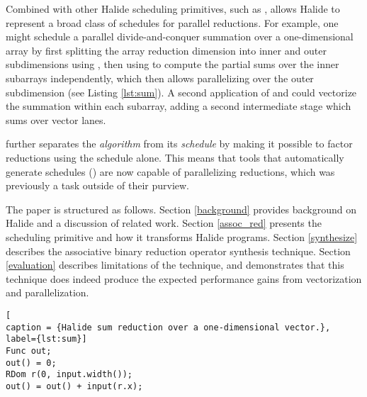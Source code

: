 Combined with other Halide scheduling primitives, such as ,  allows Halide to represent a broad class of schedules for parallel reductions. For example, one might schedule a parallel divide-and-conquer summation over a one-dimensional array by first splitting the array reduction dimension into inner and outer subdimensions using , then using  to compute the partial sums over the inner subarrays independently, which then allows parallelizing over the outer subdimension (see Listing \ref{lst:sum}). A second application of  and  could vectorize the summation within each subarray, adding a second intermediate stage which sums over vector lanes.

 further separates the \emph{algorithm} from its \emph{schedule} by making it possible to factor reductions using the schedule alone. This means that tools that automatically generate schedules (\cite{Mullapudi:2016:ASH:2897824.2925952}\cite{Ragan-Kelley:2013:HLC:2491956.2462176}) are now capable of parallelizing reductions, which was previously a task outside of their purview.


The paper is structured as follows. Section \ref{background} provides background on Halide and a discussion of related work. Section \ref{assoc_red} presents the  scheduling primitive and how it transforms Halide programs. Section \ref{synthesize} describes the associative binary reduction operator synthesis technique. Section \ref{evaluation} describes limitations of the technique, and demonstrates that this technique does indeed produce the expected performance gains from vectorization and parallelization.

\begin{lstlisting}[
caption = {Halide sum reduction over a one-dimensional vector.}, label={lst:sum}]
Func out;
out() = 0;
RDom r(0, input.width());
out() = out() + input(r.x);
\end{lstlisting}

